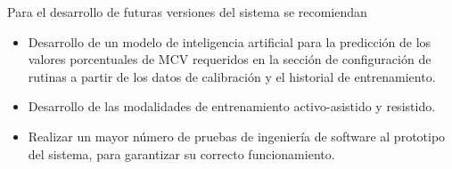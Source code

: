 \begin{recommendations}
    Para el desarrollo de futuras versiones del sistema se recomiendan 
    \begin{itemize}
        \item Desarrollo de un modelo de inteligencia artificial para la predicción de los valores porcentuales de MCV requeridos en la sección de configuración de rutinas a partir de los datos de calibración y el historial de entrenamiento.
        \item Desarrollo de las modalidades de entrenamiento activo-asistido y resistido.
        \item Realizar un mayor número de pruebas de ingeniería de software al prototipo del sistema, para garantizar su correcto funcionamiento.
    \end{itemize}
\end{recommendations}